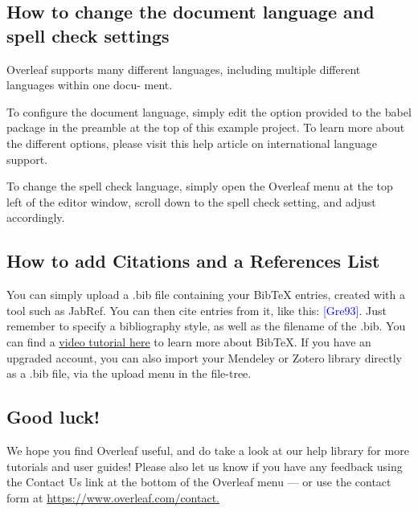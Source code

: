 \documentclass[10pt,english]{article}
\begin{document}
	\subsection{How to change the document language and spell check settings}
	Overleaf supports many different languages, including multiple different languages within one docu-
	ment.
	
	To configure the document language, simply edit the option provided to the babel package in the
	preamble at the top of this example project. To learn more about the different options, please visit
	this help article on international language support.
	
	To change the spell check language, simply open the Overleaf menu at the top left of the editor
	window, scroll down to the spell check setting, and adjust accordingly.
	\subsection{How to add Citations and a References List}
	You can simply upload a .bib file containing your BibTeX entries, created with a tool such as JabRef.
	You can then cite entries from it, like this: \textcolor{blue}{[Gre93]}. Just remember to specify a bibliography style, as
	well as the filename of the .bib. You can find a \href{https://www.overleaf.com/help/97-how-to-include-a-bibligraphy-using-bibtex}{video tutorial here} to learn more about BibTeX.
	If you have an upgraded account, you can also import your Mendeley or Zotero library directly as
	a .bib file, via the upload menu in the file-tree.
	\subsection{Good luck!}
	We hope you find Overleaf useful, and do take a look at our help library for more tutorials and user
	guides! Please also let us know if you have any feedback using the Contact Us link at the bottom of
	the Overleaf menu — or use the contact form at \href{https://www.overleaf.com/contact.}{https://www.overleaf.com/contact.}\\\\
	\cite{greenwade1993comprehensive,}
	
	
		

	
\end{document}

